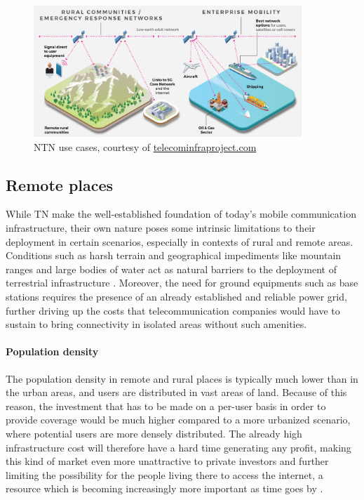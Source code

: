 \begin{figure}[ht]
    \centering
    \includegraphics[width=0.9\textwidth]{res/sat-usecases.png}
    \caption{NTN use cases, courtesy of \href{https://telecominfraproject.com/ntcs/}{telecominfraproject.com}}
    \label{fig:sat-use-cases}
\end{figure}

\subsection{Remote places}
While \ac{TN} make the well-established foundation of today’s mobile communication infrastructure, their own nature poses some intrinsic limitations to their deployment in certain scenarios, especially in contexts of rural and remote areas. Conditions such as harsh terrain and geographical impediments like mountain ranges and large bodies of water act as natural barriers to the deployment of terrestrial infrastructure \cite{ntn-6g-era-challenges-giordani}. Moreover, the need for ground equipments such as base stations requires the presence of an already established and reliable power grid, further driving up the costs that telecommunication companies would have to sustain to bring connectivity in isolated areas without such amenities.

\paragraph{Population density}
The population density in remote and rural places is typically much lower than in the urban areas, and users are distributed in vast areas of land. Because of this reason, the investment that has to be made on a per-user basis in order to provide coverage would be much higher compared to a more urbanized scenario, where potential users are more densely distributed. The already high infrastructure cost will therefore have a hard time generating any profit, making this kind of market even more unattractive to private investors and further limiting the possibility for the people living there to access the internet, a resource which is becoming increasingly more important as time goes by \cite{6g-bridging}.


